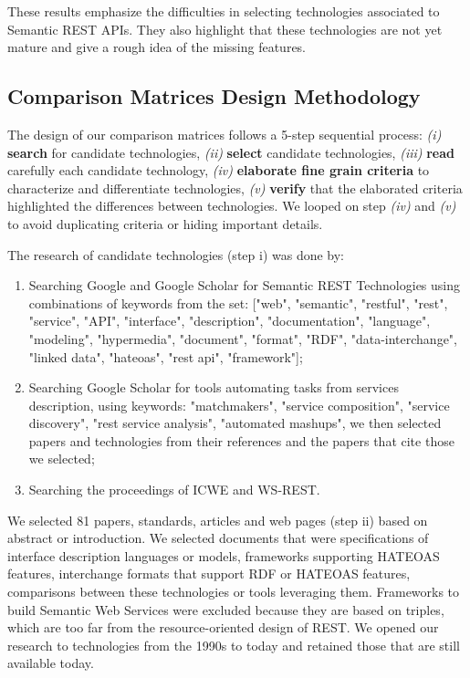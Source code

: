 These results emphasize the difficulties in selecting technologies associated to Semantic REST APIs. They also highlight that these technologies are not yet mature and give a rough idea of the missing features.

\subsection{Comparison Matrices Design Methodology}

The design of our comparison matrices follows a 5-step sequential process: \textit{(i)} \textbf{search} for candidate technologies, \textit{(ii)} \textbf{select} candidate technologies, \textit{(iii)} \textbf{read} carefully each candidate technology, \textit{(iv)} \textbf{elaborate fine grain criteria} to characterize and differentiate technologies, \textit{(v)} \textbf{verify} that the elaborated criteria highlighted the differences between technologies. We looped on step \textit{(iv)} and \textit{(v)} to avoid duplicating criteria or hiding important details.

The research of candidate technologies (step i) was done by:

\begin{enumerate}
    \item Searching Google and Google Scholar for Semantic REST Technologies using combinations of keywords from the set: ["web", "semantic", "restful", "rest", "service", "API", "interface", "description", "documentation", "language", "modeling", "hypermedia", "document", "format", "RDF", "data-interchange", "linked data", "hateoas", "rest api", "framework"];
    \item Searching Google Scholar for tools automating tasks from services description, using keywords: "matchmakers", "service composition", "service discovery", "rest service analysis", "automated mashups", we then selected papers and technologies from their references and the papers that cite those we selected;
    \item Searching the proceedings of ICWE and WS-REST. 
\end{enumerate}

We selected 81 papers, standards, articles and web pages (step ii) based on abstract or introduction. We selected documents that were specifications of interface description languages or models, frameworks supporting HATEOAS features, interchange formats that support RDF or HATEOAS features, comparisons between these technologies or tools leveraging them. Frameworks to build Semantic Web Services were excluded because they are based on triples, which are too far from the resource-oriented design of REST. We opened our research to technologies from the 1990s to today and retained those that are still available today.

